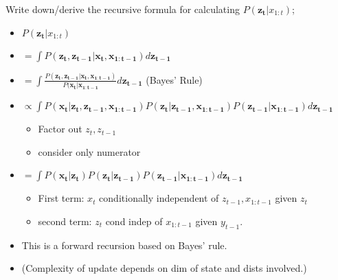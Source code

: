 \documentclass{article}
\begin{document}
Write down/derive the recursive formula for calculating $P(\mathbf{z_t}|x_{1:t})$; \begin{itemize}
    \item $P(\mathbf{z_t}|x_{1:t})$
    \item $=\int P(\mathbf{z_t, z_{t-1}|x_t, x_{1:t-1}})d\mathbf{z_{t-1}}$
    \item $=\int \frac{P(\mathbf{z_t, z_{t-1}|x_t, x_{1:t-1}})}{P(\mathbf{x_t|x_{1:t-1}}}d\mathbf{z_{t-1}}$ (Bayes' Rule)
    \item $\propto\int P(\mathbf{x_t| z_t, z_{t-1}, x_{1:t-1}})P(\mathbf{z_t|z_{t-1}, x_{1:t-1}}) P(\mathbf{z_{t-1}|x_{1:t-1}}) d\mathbf{z_{t-1}}$
    \begin{itemize}
        \item Factor out $z_t, z_{t-1}$
        \item consider only numerator
    \end{itemize}
    \item $=\int P(\mathbf{x_t| z_t})P(\mathbf{z_t|z_{t-1}}) P(\mathbf{z_{t-1}|x_{1:t-1}}) d\mathbf{z_{t-1}}$
    \begin{itemize}
        \item First term: $x_t$ conditionally independent of $z_{t-1}, x_{1:t-1}$ given $z_t$
        \item second term: $z_t$ cond indep of $x_{1:t-1}$ given $y_{t-1}$.
    \end{itemize}
    \item This is a forward recursion based on Bayes' rule. 
    \item (Complexity of update depends on dim of state and dists involved.)
\end{itemize}
\end{document}

